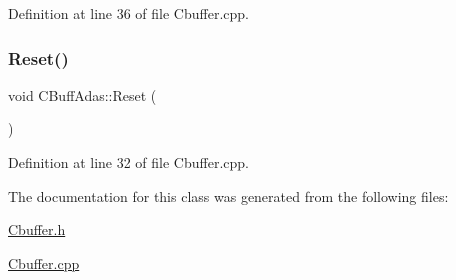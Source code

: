 Definition at line 36 of file Cbuffer.\+cpp.

\mbox{\label{class_c_buff_adas_a2ff1ee5f1dfa56117d76b17027d7b7e8}} 
\subsubsection{\texorpdfstring{Reset()}{Reset()}}
{\footnotesize\ttfamily void C\+Buff\+Adas\+::\+Reset (\begin{DoxyParamCaption}{ }\end{DoxyParamCaption})}



Definition at line 32 of file Cbuffer.\+cpp.



The documentation for this class was generated from the following files\+:\begin{DoxyCompactItemize}
\item 
\mbox{\hyperlink{_cbuffer_8h}{Cbuffer.\+h}}\item 
\mbox{\hyperlink{_cbuffer_8cpp}{Cbuffer.\+cpp}}\end{DoxyCompactItemize}
